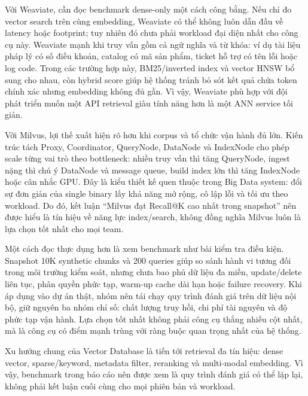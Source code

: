 Với Weaviate, cần đọc benchmark dense-only một cách công bằng. Nếu chỉ đo vector search trên cùng embedding, Weaviate có thể không luôn dẫn đầu về latency hoặc footprint; tuy nhiên đó chưa phải workload đại diện nhất cho công cụ này. Weaviate mạnh khi truy vấn gồm cả ngữ nghĩa và từ khóa: ví dụ tài liệu pháp lý có số điều khoản, catalog có mã sản phẩm, ticket hỗ trợ có tên lỗi hoặc log code. Trong các trường hợp này, BM25/inverted index và vector HNSW bổ sung cho nhau, còn hybrid score giúp hệ thống tránh bỏ sót kết quả chứa token chính xác nhưng embedding không đủ gần. Vì vậy, Weaviate phù hợp với đội phát triển muốn một API retrieval giàu tính năng hơn là một ANN service tối giản.

Với Milvus, lợi thế xuất hiện rõ hơn khi corpus và tổ chức vận hành đủ lớn. Kiến trúc tách Proxy, Coordinator, QueryNode, DataNode và IndexNode cho phép scale từng vai trò theo bottleneck: nhiều truy vấn thì tăng QueryNode, ingest nặng thì chú ý DataNode và message queue, build index lớn thì tăng IndexNode hoặc cân nhắc GPU. Đây là kiểu thiết kế quen thuộc trong Big Data system: đổi sự đơn giản của single binary lấy khả năng mở rộng, cô lập lỗi và tối ưu theo workload. Do đó, kết luận ``Milvus đạt Recall@K cao nhất trong snapshot'' nên được hiểu là tín hiệu về năng lực index/search, không đồng nghĩa Milvus luôn là lựa chọn tốt nhất cho mọi team.

Một cách đọc thực dụng hơn là xem benchmark như bài kiểm tra điều kiện. Snapshot 10K synthetic chunks và 200 queries giúp so sánh hành vi tương đối trong môi trường kiểm soát, nhưng chưa bao phủ dữ liệu đa miền, update/delete liên tục, phân quyền phức tạp, warm-up cache dài hạn hoặc failure recovery. Khi áp dụng vào dự án thật, nhóm nên tái chạy quy trình đánh giá trên dữ liệu nội bộ, giữ nguyên ba nhóm chỉ số: chất lượng truy hồi, chi phí tài nguyên và độ phức tạp vận hành. Lựa chọn tốt nhất không phải công cụ thắng nhiều cột nhất, mà là công cụ có điểm mạnh trùng với ràng buộc quan trọng nhất của hệ thống.

Xu hướng chung của Vector Database là tiến tới retrieval đa tín hiệu: dense vector, sparse/keyword, metadata filter, reranking và multi-modal embedding. Vì vậy, benchmark trong báo cáo nên được xem là quy trình đánh giá có thể lặp lại, không phải kết luận cuối cùng cho mọi phiên bản và workload.
